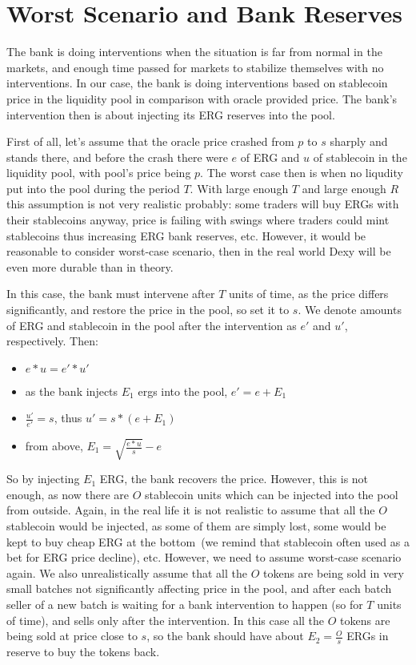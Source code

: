 \documentclass{article}   %
\newcommand{\bc}{ERG}
\newcommand{\sct}{stablecoin}
\newcommand{\dx}{Dexy}
\begin{document}
\section{Worst Scenario and Bank Reserves}

The bank is doing interventions when the situation is far from normal in the markets, and enough time passed for markets to stabilize themselves with no interventions. In our case, the bank is doing interventions based on stablecoin price in the liquidity pool in comparison with oracle provided price. The bank's intervention then is about injecting its \bc{} reserves into the pool.  

First of all, let's assume that the oracle price crashed from $p$ to $s$ sharply and stands there, and before the crash there were $e$ of \bc{} and $u$ of \sct{} in the liquidity pool, with pool's price being $p$. The worst case then is when no liqudity put into the pool during the period $T$. With large enough $T$ and large enough $R$ this assumption is not very realistic probably: some traders will buy \bc{}s with their \sct{}s anyway, price is failing with swings where traders could mint \sct{}s thus increasing \bc{} bank reserves, etc. However, it would be reasonable to consider worst-case scenario, then in the real world \dx{} will be even more durable than in theory. 

In this case, the bank must intervene after $T$ units of time, as the price differs significantly, and restore the price in the pool, so set it to $s$. We denote amounts of \bc{} and \sct{} in the pool after the intervention as $e'$ and $u'$, respectively. Then:

\begin{itemize}
  \item{} $e * u = e' * u'$
  \item{} as the bank injects $E_1$ ergs into the pool, $e' = e + E_1$
  \item{} $\frac{u'}{e'} = s$, thus $u' = s * (e + E_1)$ 
  \item{} from above, $E_1 = \sqrt{\frac{e * u}{s}} - e$
\end{itemize}

So by injecting $E_1$ \bc{}, the bank recovers the price. However, this is not enough, as now there are $O$ \sct{} units which can be injected into the pool from outside. 
Again, in the real life it is not realistic to assume that all the $O$ \sct{} would be injected, as some of them are simply lost, some would be kept to buy cheap ERG at the bottom~(we remind that \sct{} often used as a bet for \bc{} price decline), etc. However, we need to assume worst-case scenario again. We also unrealistically assume that all the $O$ tokens are being sold in very small batches not significantly affecting price in the pool, and after each batch seller of a new batch is waiting for a bank intervention to happen (so for $T$ units of time), and sells only after the intervention. In this case all the $O$ tokens are being sold at price close to $s$, so the bank should have about $E_2 = \frac{O}{s}$ \bc{}s in reserve to buy the tokens back.
\end{document}
